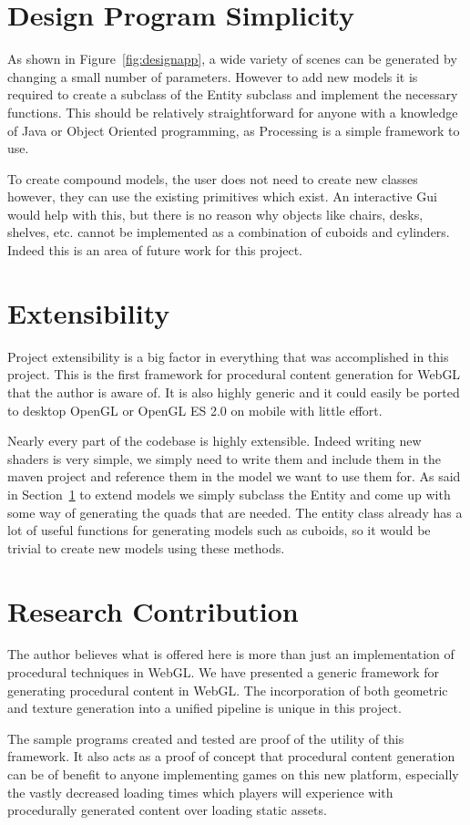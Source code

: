 \section{Design Program Simplicity}
\label{sec:designsimplicity}
As shown in Figure~\ref{fig:designapp}, a wide variety of scenes can be generated by changing a small number of parameters.
However to add new models it is required to create a subclass of the Entity subclass and implement the necessary functions.
This should be relatively straightforward for anyone with a knowledge of Java or Object Oriented programming, as Processing is a simple framework to use.

To create compound models, the user does not need to create new classes however, they can use the existing primitives which exist.
An interactive Gui would help with this, but there is no reason why objects like chairs, desks, shelves, etc. cannot be implemented as a combination of cuboids and cylinders.
Indeed this is an area of future work for this project.

\section{Extensibility}
Project extensibility is a big factor in everything that was accomplished in this project.
This is the first framework for procedural content generation for WebGL that the author is aware of.
It is also highly generic and it could easily be ported to desktop OpenGL or OpenGL ES 2.0 on mobile with little effort.

Nearly every part of the codebase is highly extensible.
Indeed writing new shaders is very simple, we simply need to write them and include them in the maven project and reference them in the model we want to use them for.
As said in Section~\ref{sec:designsimplicity} to extend models we simply subclass the Entity and come up with some way of generating the quads that are needed.
The entity class already has a lot of useful functions for generating models such as cuboids, so it would be trivial to create new models using these methods.

\section{Research Contribution}
The author believes what is offered here is more than just an implementation of procedural techniques in WebGL.
We have presented a generic framework for generating procedural content in WebGL.
The incorporation of both geometric and texture generation into a unified pipeline is unique in this project.

The sample programs created and tested are proof of the utility of this framework.
It also acts as a proof of concept that procedural content generation can be of benefit to anyone implementing games on this new platform, especially the vastly decreased loading times which players will experience with procedurally generated content over loading static assets.
